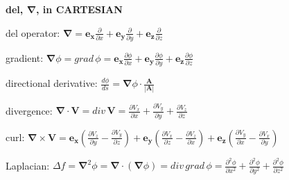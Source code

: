 \documentclass[letterpaper,landscape,10pt]{article}
\newenvironment{mydescription}
{\begin{description}
	\setlength{\itemsep}{0pt}
	\setlength{\parskip}{0pt}
	\setlength{\parsep}{-1pt}}
{\end{description}}
\begin{document}
{\begin{multicols}{4}
\begin{center}
\begin{minipage}{\columnwidth}
     \end{minipage}
	\end{center}
	\begin{center}\textbf{del, $\bm{\nabla}$, in CARTESIAN}\end{center}
		\begin{mydescription}
			\item[del operator:]
				$\bm{\nabla} =
				\bm{e_x} \frac{\partial}{\partial x} +
				\bm{e_y}\frac{\partial}{\partial y} + 
				\bm{e_z}\frac{\partial}{\partial z}$  
			\item[gradient:]
				$\bm{\nabla}\phi =
				grad\,\phi =
				\bm{e_x}\frac{\partial\phi}{\partial x} +
				\bm{e_y}\frac{\partial\phi}{\partial y} +
				\bm{e_z}\frac{\partial\phi}{\partial z}$  
			\item[directional derivative:]
				$\frac{d\phi}{ds} =
					\bm{\nabla}\phi \cdot \frac{\bm{A}}{|\bm{A}|}$  
			\item[divergence:]
				$\bm{\nabla}\cdot\bm{V} =
				div\, \bm{V} =
					\frac{\partial V_x}{\partial x} +
					\frac{\partial V_y}{\partial y} +
					\frac{\partial V_z}{\partial z}$  
			\item[curl:]
				$\bm{\nabla}\times \bm{V} =
				\bm{e_x}\left(\frac{\partial V_z}{\partial y} -
					\frac{\partial V_y}{\partial z}\right) +
					\bm{e_y} \left( \frac{\partial V_x}{\partial z} -
					\frac{\partial V_z}{\partial x}\right) +
					\bm{e_z} \left( \frac{\partial V_y}{\partial x} -
					\frac{\partial V_x}{\partial y} \right) $  
			\item[Laplacian:]
				$\Delta f = \bm{\nabla}^2\phi =
				\bm{\nabla} \cdot (\bm{\nabla}\phi) = div\, grad\, \phi =
					\frac{\partial^2 \phi}{\partial x^2} +
					\frac{\partial^2 \phi}{\partial y^2} +
					\frac{\partial^2 \phi}{\partial z^2}$ 
		\end{mydescription}


\end{multicols}}
\end{document}
